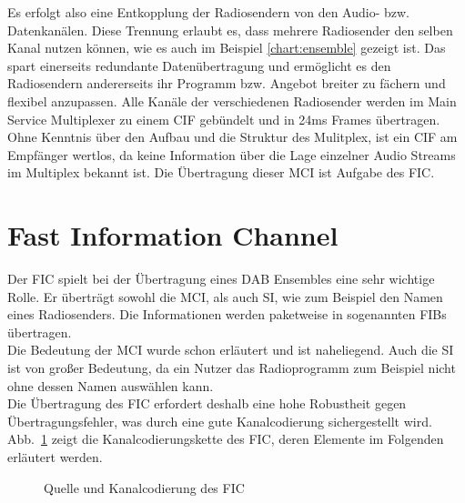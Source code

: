 Es erfolgt also eine Entkopplung der Radiosendern von den Audio- bzw. Datenkanälen. Diese Trennung erlaubt es, dass mehrere Radiosender den selben Kanal nutzen können, wie es auch im Beispiel \ref{chart:ensemble} gezeigt ist. Das spart einerseits redundante Datenübertragung und ermöglicht es den Radiosendern andererseits ihr Programm bzw. Angebot breiter zu fächern und flexibel anzupassen. Alle Kanäle der verschiedenen Radiosender werden im Main Service Multiplexer zu einem \ac{CIF} gebündelt und in 24ms Frames übertragen. \\

Ohne Kenntnis über den Aufbau und die Struktur des Mulitplex, ist ein \ac{CIF} am Empfänger wertlos, da keine Information über die Lage einzelner Audio Streams im Multiplex bekannt ist. Die Übertragung dieser \ac{MCI} ist Aufgabe des \ac{FIC}.

\section{Fast Information Channel}
\label{sec:FIC}
Der \ac{FIC} spielt bei der Übertragung eines DAB Ensembles eine sehr wichtige Rolle. Er überträgt sowohl die \ac{MCI}, als auch \ac{SI}, wie zum Beispiel den Namen eines Radiosenders. Die Informationen werden paketweise in sogenannten \acp{FIB} übertragen.\\
Die Bedeutung der \ac{MCI} wurde schon erläutert und ist naheliegend. Auch die \ac{SI} ist von großer Bedeutung, da ein Nutzer das Radioprogramm zum Beispiel nicht ohne dessen Namen auswählen kann. \\
Die Übertragung des FIC erfordert deshalb eine hohe Robustheit gegen Übertragungsfehler, was durch eine gute Kanalcodierung sichergestellt wird. Abb.~\ref{chart:fic_encoder} zeigt die Kanalcodierungskette des FIC, deren Elemente im Folgenden erläutert werden.\\
\begin{figure} [htb]
\begin{center}
\end{center}
\caption{Quelle und Kanalcodierung des FIC}
\label{chart:fic_encoder}
\end{figure}

